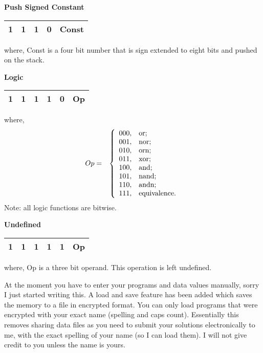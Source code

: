 \textbf{Push Signed Constant}

\begin{tabular}{|cc|c|c|c|}
\hline
  1 & 1 & 1 & 0 & Const \\ \hline
\end{tabular}

where, Const is a four bit number that is sign extended to eight bits and pushed on the stack.


\textbf{Logic}

\begin{tabular}{|cc|c|c|c|c|}
\hline
  1 & 1 & 1 & 1 & 0 & Op \\ \hline
\end{tabular}

where,
\begin{eqnarray*}
  Op &=& \left\{%
\begin{array}{ll}
    000, & \hbox{or;} \\
    001, & \hbox{nor;} \\
    010, & \hbox{orn;} \\
    011, & \hbox{xor;} \\
    100, & \hbox{and;} \\
    101, & \hbox{nand;} \\
    110, & \hbox{andn;} \\
    111, & \hbox{equivalence.} \\
\end{array}%
\right.
\end{eqnarray*}
Note: all logic functions are bitwise.


\textbf{Undefined}

\begin{tabular}{|cc|c|c|c|c|}
\hline
  1 & 1 & 1 & 1 & 1 & Op \\ \hline
\end{tabular}

where, Op is a three bit operand.  This operation is left undefined.

At the moment you have to enter your programs and data values manually, sorry I just started writing this.  A load and save feature has been added which saves the memory to a file in encrypted format.  You can only load programs that were encrypted with your exact name (spelling and caps count).  Essentially this removes sharing data files as you need to submit your solutions electronically to me, with the exact spelling of your name (so I can load them).  I will not give credit to you unless the name is yours.

